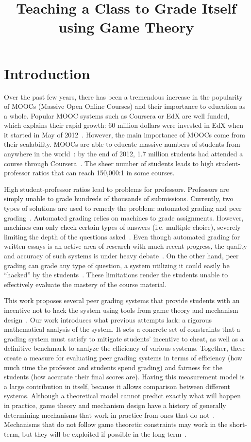 \documentclass[12pt, Arial]{article}
\title{Teaching a Class to Grade Itself using Game Theory}
\author{}%
\date{}
\begin{document}
\maketitle
\section{Introduction}
Over the past few years, there has been a tremendous increase in the popularity of MOOCs (Massive Open Online Courses) and their importance to education as a whole. Popular MOOC systems such as Coursera or EdX are well funded, which explains their rapid growth: 60 million dollars were invested in EdX when it started in May of 2012~\cite{canmoocsreducecc}. However, the main importance of MOOCs come from their scalability. MOOCs are able to educate massive numbers of students from anywhere in the world~\cite{makingsenseofmoocs}: by the end of 2012, 1.7 million students had attended a course through Coursera~\cite{swotanalysisofmoocs}. The sheer number of students leads to high student-professor ratios that can reach 150,000:1 in some courses.

High student-professor ratios lead to problems for professors. Professors are simply unable to grade hundreds of thousands of submissions. Currently, two types of solutions are used to remedy the problem: automated grading and peer grading~\cite{edxsoftware}. Automated grading relies on machines to grade assignments. However, machines can only check certain types of answers (i.e. multiple choice), severely limiting the depth of the questions asked~\cite{rightandwrongmoocs}. Even though automated grading for written essays is an active area of research with much recent progress, the quality and accuracy of such systems is under heavy debate~\cite{automatedsystemssuck}. On the other hand, peer grading can grade any type of question, a system utilizing it could easily be ``hacked'' by the students~\cite{makingsenseofmoocs}. These limitations render the students unable to effectively evaluate the mastery of the course material. 

This work proposes several peer grading systems that provide students with an incentive not to hack the system using tools from game theory and mechanism design~\cite{AGTbook}. Our work introduces what previous attempts lack: a rigorous mathematical analysis of the system. It sets a concrete set of constraints that a grading system must satisfy to mitigate students' incentive to cheat, as well as a definitive benchmark to analyze the efficiency of various systems. Together, these create a measure for evaluating peer grading systems in terms of efficiency (how much time the professor and students spend grading) and fairness for the students (how accurate their final scores are). Having this measurement model is a large contribution in itself, because it allows comparison between different systems. Although a theoretical model cannot predict exactly what will happen in practice, game theory and mechanism design have a history of generally determining mechanisms that work in practice from ones that do not~\cite{AGTbook}. Mechanisms that do not follow game theoretic constraints may work in the short-term, but they will be exploited if possible in the long term~\cite{boycottfinal}.
\end{document}
